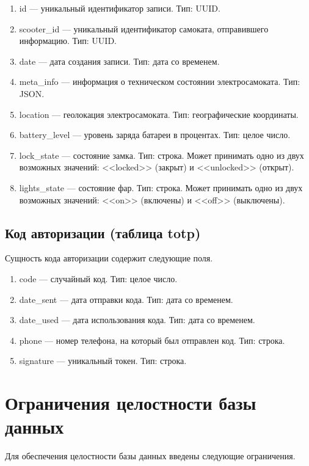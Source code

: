 \begin{enumerate}
    \item id --- уникальный идентификатор записи. Тип: UUID. 
    \item scooter\_id --- уникальный идентификатор самоката, отправившего информацию. Тип: UUID. 
    \item date --- дата создания записи. Тип: дата со временем. 
    \item meta\_info --- информация о техническом состоянии электросамоката. Тип: JSON. 
    \item location --- геолокация электросамоката. Тип: географические координаты. 
    \item battery\_level --- уровень заряда батареи в процентах. Тип: целое число. 
    \item lock\_state --- состояние замка. Тип: строка. Может принимать одно из двух возможных значений: <<locked>> (закрыт) и <<unlocked>> (открыт). 
    \item lights\_state --- состояние фар. Тип: строка. Может принимать одно из двух возможных значений: <<on>> (включены) и <<off>> (выключены). 
\end{enumerate}

\subsection{Код авторизации (таблица totp)}

Сущность кода авторизации содержит следующие поля.

\begin{enumerate}
    \item code --- случайный код. Тип: целое число. 
    \item date\_sent --- дата отправки кода. Тип: дата со временем. 
    \item date\_used --- дата использования кода. Тип: дата со временем.
    \item phone --- номер телефона, на который был отправлен код. Тип: строка. 
    \item signature --- уникальный токен. Тип: строка. 
\end{enumerate}

\section{Ограничения целостности базы данных}

Для обеспечения целостности базы данных введены следующие ограничения.

